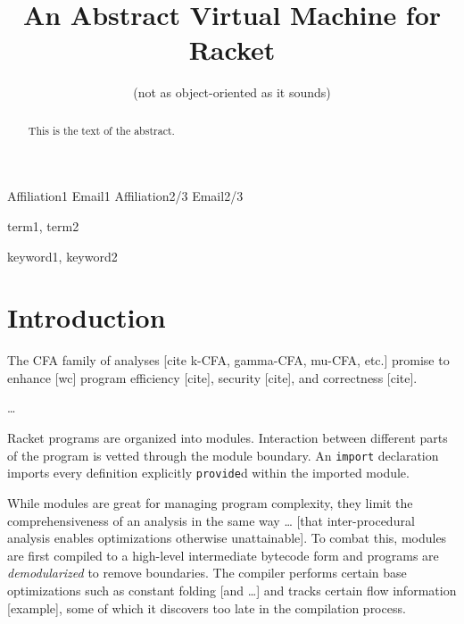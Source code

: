 \documentclass[preprint]{sigplanconf}
\begin{document}
\copyrightdata{[to be supplied]} 


\title{An Abstract Virtual Machine for Racket}
\subtitle{(not as object-oriented as it sounds)}

           {Affiliation1}
           {Email1}
           {Affiliation2/3}
           {Email2/3}

\maketitle

\begin{abstract}
This is the text of the abstract.
\end{abstract}


\terms
term1, term2

\keywords
keyword1, keyword2

\section{Introduction}

The CFA family of analyses [cite k-CFA, gamma-CFA, mu-CFA, etc.] promise to enhance [wc] program efficiency [cite], security [cite], and correctness [cite].

…

Racket programs are organized into modules.
Interaction between different parts of the program is vetted through the module boundary.
An \texttt{import} declaration imports every definition explicitly \texttt{provide}d within the imported module.

While modules are great for managing program complexity, they limit the comprehensiveness of an analysis in the same way … [that inter-procedural analysis enables optimizations otherwise unattainable].
To combat this, modules are first compiled to a high-level intermediate bytecode form and programs are \textit{demodularized} to remove boundaries.
The compiler performs certain base optimizations such as constant folding [and …] and tracks certain flow information [example], some of which it discovers too late in the compilation process.
\end{document}
